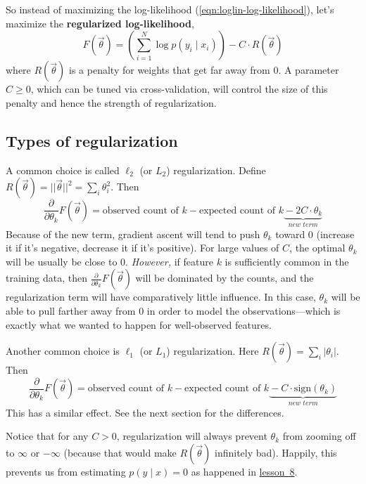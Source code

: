 \documentclass[11pt]{article}
\newcommand{\vtheta}{\vec{\theta}}
\newcommand{\diffk}{\frac{\partial}{\partial \theta_k}}
\newcommand{\lesson}[1]{\href{http://cs.jhu.edu/~jason/tutorials/loglin/\##1}{lesson~#1}}
\begin{document}
So instead of maximizing the log-likelihood
(\ref{eqn:loglin-log-likelihood}), let's maximize the
{\bf regularized log-likelihood},
\begin{equation}\label{eqn:loglin-regularized}
  F(\vtheta) = \left( \sum_{i=1}^N \log p(y_i \mid x_i) \right) - C\cdot R(\vtheta)
\end{equation}
where $R(\vtheta)$ is a penalty for weights that get far away from 0.
A parameter $C \geq 0$, which can be tuned via cross-validation, will control the size of this penalty and
hence the strength of regularization.

\subsection{Types of regularization}

A common choice is called $\ell_2$ (or $L_2$) regularization.  Define
$R(\vtheta) = ||\vtheta||^2 = \sum_i \theta_i^2$.  Then
\begin{equation}
  \diffk F(\vtheta) = \textrm{observed count of $k$} -
  \textrm{expected count of $k$} \underbrace{\mbox{}-2C \cdot
    \theta_k}_{\textit{new term}}
\end{equation}
Because of the new term, gradient ascent will tend to push $\theta_k$
toward 0 (increase it if it's negative, decrease it if it's positive).
For large values of $C$, the optimal $\theta_k$ will be usually be
close to 0.  {\em However,} if feature $k$ is sufficiently common in the
training data, then $\diffk F(\vtheta)$ will be dominated by the
counts, and the regularization term will have comparatively little
influence.  In this case, $\theta_k$ will be able to pull farther away
from 0 in order to model the observations---which is exactly what we
wanted to happen for well-observed features.

Another common choice is $\ell_1$ (or $L_1$) regularization.  Here
$R(\vtheta) = \sum_i |\theta_i|$.  Then
\begin{equation}
  \diffk F(\vtheta) = \textrm{observed count of $k$} -
  \textrm{expected count of $k$} \underbrace{\mbox{}-C\cdot \textrm{sign}(\theta_k)}_{\textit{new term}}
\end{equation}
This has a similar effect.  See the next section for the differences.

Notice that for any $C > 0$, regularization will always prevent
$\theta_k$ from zooming off to $\infty$ or $-\infty$ (because that
would make $R(\vtheta)$ infinitely bad).  Happily, this prevents us from
estimating $p(y\mid x)=0$ as happened in \lesson{8}.
\end{document}
